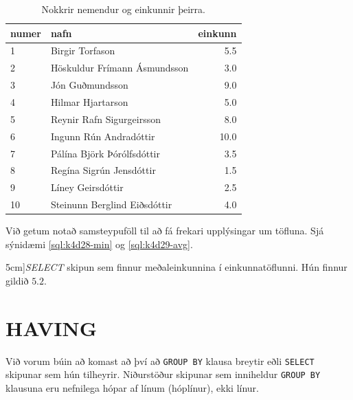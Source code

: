 \begin{table}
\centering
\caption[Einkunnir]{Nokkrir nemendur og einkunnir þeirra.}
\label{tafla:einkunnir}
\begin{tabular}{llr}
\toprule
numer&nafn&einkunn\\
\midrule
1&Birgir Torfason&5.5\\
2&Höskuldur Frímann Ásmundsson&3.0\\
3&Jón Guðmundsson&9.0\\
4&Hilmar Hjartarson&5.0\\
5&Reynir Rafn Sigurgeirsson&8.0\\
6&Ingunn Rún Andradóttir&10.0\\
7&Pálína Björk Þórólfsdóttir&3.5\\
8&Regína Sigrún Jensdóttir&1.5\\
9&Líney Geirsdóttir&2.5\\
10&Steinunn Berglind Eiðsdóttir&4.0\\
\bottomrule
\end{tabular}
\end{table}

Við getum notað samsteypuföll til að fá frekari upplýsingar um töfluna. Sjá sýnidæmi \ref{sql:k4d28-min} og \ref{sql:k4d29-avg}.


\begin{example}
\vspace{5cm}
\caption[AVG fallið][5cm]{\emph{SELECT} skipun sem finnur meðaleinkunnina í einkunnatöflunni. Hún finnur gildið $5.2$.}
\label{sql:k4d29-avg}
\centering
{}
\end{example}

\section{HAVING}
\label{undirkafli:having}
Við vorum búin að komast að því að \verb|GROUP BY| klausa breytir eðli \verb|SELECT| skipunar sem hún tilheyrir. Niðurstöður skipunar sem inniheldur \verb|GROUP BY| klausuna eru nefnilega hópar af línum (hóplínur), ekki línur.

